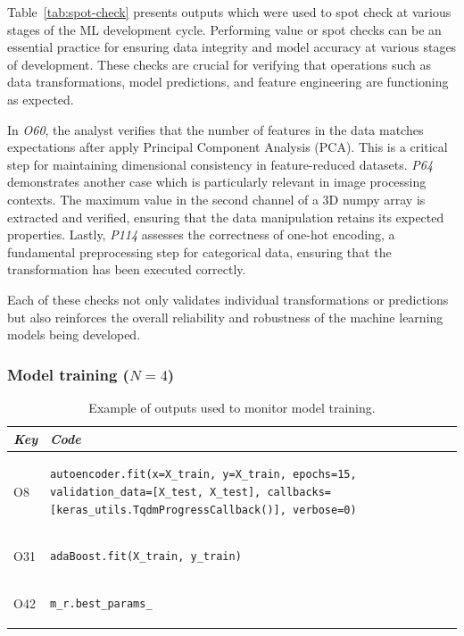 Table~\ref{tab:spot-check} presents outputs which were used to spot check at various stages of the ML development cycle. Performing value or spot checks can be an essential practice for ensuring data integrity and model accuracy at various stages of development. These checks are crucial for verifying that operations such as data transformations, model predictions, and feature engineering are functioning as expected.


In \emph{O60}, the analyst verifies that the number of features in the data matches expectations after apply Principal Component Analysis (PCA). This is a critical step for maintaining dimensional consistency in feature-reduced datasets. \emph{P64} demonstrates another case which is particularly relevant in image processing contexts. The maximum value in the second channel of a 3D numpy array is extracted and verified, ensuring that the data manipulation retains its expected properties. Lastly, \emph{P114} assesses the correctness of one-hot encoding, a fundamental preprocessing step for categorical data, ensuring that the transformation has been executed correctly.

Each of these checks not only validates individual transformations or predictions but also reinforces the overall reliability and robustness of the machine learning models being developed.

\subsubsection{Model training ($N = 4$)}

\begin{table}
\centering
\begin{tabular}{@{}m{} m{}@{}}
\toprule
\emph{\textbf{Key}}&
\emph{\textbf{Code}}\\
\midrule

O8 &
\begin{lstlisting}
autoencoder.fit(x=X_train, y=X_train, epochs=15, validation_data=[X_test, X_test], callbacks=[keras_utils.TqdmProgressCallback()], verbose=0)
\end{lstlisting}\\

O31 &
\begin{lstlisting}
adaBoost.fit(X_train, y_train)
\end{lstlisting}\\

O42&
\begin{lstlisting}
m_r.best_params_
\end{lstlisting}\\
\end{tabular}
\caption{Example of outputs used to monitor model training.}
\label{tab:model-training}
\end{table}

